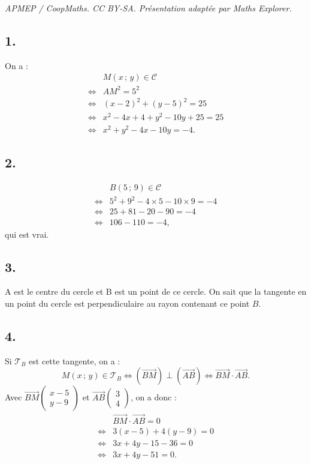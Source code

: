 \documentclass[10pt]{article}
\begin{document}
\noindent\textit{APMEP / CoopMaths. CC BY-SA. Présentation adaptée par Maths Explorer.}\par\medskip
\subsection*{1.}

On a :
\begin{align*}
&M(x \,;\, y) \in \mathcal{C} \\
\iff &AM^2 = 5^2 \\
\iff &(x - 2)^2 + (y - 5)^2 = 25 \\
\iff &x^2 - 4x + 4 + y^2 - 10y + 25 = 25 \\
\iff &x^2 + y^2 - 4x - 10y = -4.
\end{align*}

\subsection*{2.}

\begin{align*}
&B(5 \,;\, 9) \in \mathcal{C} \\
\iff &5^2 + 9^2 - 4 \times 5 - 10 \times 9 = -4 \\
\iff &25 + 81 - 20 - 90 = -4 \\
\iff &106 - 110 = -4,
\end{align*}
qui est vrai.

\subsection*{3.}

A est le centre du cercle et B est un point de ce cercle. On sait que la tangente en un point du cercle est perpendiculaire au rayon contenant ce point \(B\).

\subsection*{4.}

Si \(\mathcal{T}_B\) est cette tangente, on a :
\[
M(x \,;\, y) \in \mathcal{T}_B \iff (\overrightarrow{BM}) \perp (\overrightarrow{AB}) \iff \overrightarrow{BM} \cdot \overrightarrow{AB}.
\]
Avec \(\overrightarrow{BM} \begin{pmatrix} x - 5 \\ y - 9 \end{pmatrix}\) et \(\overrightarrow{AB} \begin{pmatrix} 3 \\ 4 \end{pmatrix}\), on a donc :
\begin{align*}
&\overrightarrow{BM} \cdot \overrightarrow{AB} = 0 \\
\iff &3(x - 5) + 4(y - 9) = 0 \\
\iff &3x + 4y - 15 - 36 = 0 \\
\iff &3x + 4y - 51 = 0.
\end{align*}
\end{document}
